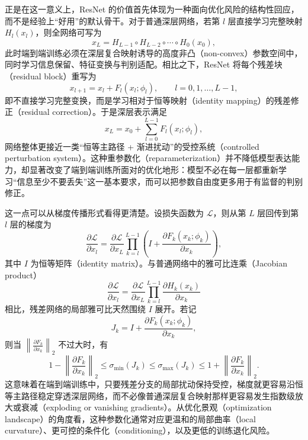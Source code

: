正是在这一意义上，ResNet 的价值首先体现为一种面向优化风险的结构性回应，而不是经验上“好用”的默认骨干。对于普通深层网络，若第 $l$ 层直接学习完整映射 $H_{l}(x_{l})$，则全网络可写为
\begin{equation}
    x_{L} = H_{L-1} \circ H_{L-2} \circ \cdots \circ H_{0}(x_{0}),
\end{equation}
此时端到端训练必须在深层复合映射诱导的高度非凸（non-convex）参数空间中，同时学习信息保留、特征变换与判别适配。相比之下，ResNet 将每个残差块（residual block）重写为
\begin{equation}
    x_{l+1} = x_{l} + F_{l}(x_{l}; \phi_{l}), \qquad l = 0,1,\dots,L-1,
\end{equation}
即不直接学习完整变换，而是学习相对于恒等映射（identity mapping）的残差修正（residual correction）。于是深层表示满足
\begin{equation}
    x_{L} = x_{0} + \sum_{l=0}^{L-1} F_{l}(x_{l}; \phi_{l}),
\end{equation}
网络整体更接近一类“恒等主路径 + 渐进扰动”的受控系统（controlled perturbation system）。这种重参数化（reparameterization）并不降低模型表达能力，却显著改变了端到端训练所面对的优化地形：模型不必在每一层都重新学习“信息至少不要丢失”这一基本要求，而可以把参数自由度更多用于有监督的判别修正\cite{He2016ResNet}。

这一点可以从梯度传播形式看得更清楚。设损失函数为 $\mathcal{L}$，则从第 $L$ 层回传到第 $l$ 层的梯度为
\begin{equation}
    \frac{\partial \mathcal{L}}{\partial x_{l}}
    =
    \frac{\partial \mathcal{L}}{\partial x_{L}}
    \prod_{k=l}^{L-1}
    \left(
    I + \frac{\partial F_{k}(x_{k}; \phi_{k})}{\partial x_{k}}
    \right),
\end{equation}
其中 $I$ 为恒等矩阵（identity matrix）。与普通网络中的雅可比连乘（Jacobian product）
\begin{equation}
    \frac{\partial \mathcal{L}}{\partial x_{l}}
    =
    \frac{\partial \mathcal{L}}{\partial x_{L}}
    \prod_{k=l}^{L-1}
    \frac{\partial H_{k}(x_{k})}{\partial x_{k}}
\end{equation}
相比，残差网络的局部雅可比天然围绕 $I$ 展开。若记
\begin{equation}
    J_{k} = I + \frac{\partial F_{k}(x_{k}; \phi_{k})}{\partial x_{k}},
\end{equation}
则当 $\left\| \frac{\partial F_{k}}{\partial x_{k}} \right\|_{2}$ 不过大时，有
\begin{equation}
    1 - \left\| \frac{\partial F_{k}}{\partial x_{k}} \right\|_{2}
    \le
    \sigma_{\min}(J_{k})
    \le
    \sigma_{\max}(J_{k})
    \le
    1 + \left\| \frac{\partial F_{k}}{\partial x_{k}} \right\|_{2}.
\end{equation}
这意味着在端到端训练中，只要残差分支的局部扰动保持受控，梯度就更容易沿恒等主路径稳定穿透深层网络，而不必像普通深层复合映射那样更容易发生指数级放大或衰减（exploding or vanishing gradients）。从优化景观（optimization landscape）的角度看，这种参数化通常对应更温和的局部曲率（local curvature）、更可控的条件化（conditioning），以及更低的训练退化风险。

